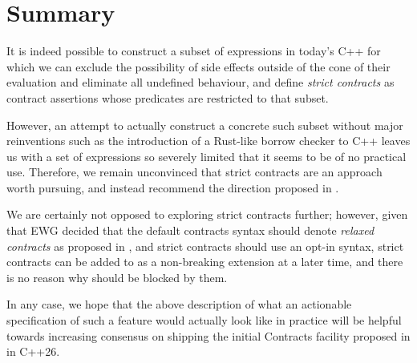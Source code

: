 \section{Summary}

It is indeed possible to construct a subset of expressions in today's C++ for which we can exclude the possibility of side effects outside of the cone of their evaluation and eliminate all undefined behaviour, and define \emph{strict contracts} as contract assertions whose predicates are restricted to that subset.

However, an attempt to actually construct a concrete such subset without major reinventions such as the introduction of a Rust-like borrow checker to C++ leaves us with a set of expressions so severely limited that it seems to be of no practical use. Therefore, we remain unconvinced that strict contracts are an approach worth pursuing, and instead recommend the direction proposed in \cite{P3100R1}.

We are certainly not opposed to exploring strict contracts further; however, given that EWG decided that the default contracts syntax  should denote \emph{relaxed contracts} as proposed in \cite{P2900R13}, and strict contracts should use an opt-in syntax, strict contracts can be added to \cite{P2900R13} as a non-breaking extension at a later time, and there is no reason why \cite{P2900R13} should be blocked by them.

In any case, we hope that the above description of what an actionable specification of such a feature would actually look like in practice will be helpful towards increasing consensus on shipping the initial Contracts facility proposed in \cite{P2900R13} in C++26.




\renewcommand{\addcontentsline}[3]{}%







